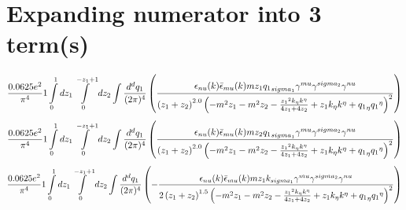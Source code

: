 \section*{Expanding numerator into 3 term(s)}
\begin{dmath}\frac{0.0625 e^{2}}{\pi^{4}}1\int\limits_{ 0 }^{ 1 } d{ z_{ 1 } }\int\limits_{ 0 }^{ - { z_{ 1 } } + 1 } d{ z_{ 2 } }\int\frac{d^d q_1 }{ (2\pi)^4 }\left(\frac{\epsilon_{ \\nu }({ k }) \bar{\epsilon}_{ \\mu }({ k }) m { z_{ 1 } } { { q_1 }_{ \\sigma_1 } } { \gamma^{ \\mu } } { \gamma^{ \\sigma_2 } } { \gamma^{ \\nu } }}{\left({ z_{ 1 } } + { z_{ 2 } }\right)^{2.0} \left(- m^{2} { z_{ 1 } } - m^{2} { z_{ 2 } } - \frac{{ z_{ 1 } }^{2} { { k }_{ \eta } } { { k }^{ \eta } }}{4 { z_{ 1 } } + 4 { z_{ 2 } }} + { z_{ 1 } } { { k }_{ \eta } } { { k }^{ \eta } } + { { q_1 }_{ \eta } } { { q_1 }^{ \eta } }\right)^{2}}\right)\end{dmath}
\begin{dmath}\frac{0.0625 e^{2}}{\pi^{4}}1\int\limits_{ 0 }^{ 1 } d{ z_{ 1 } }\int\limits_{ 0 }^{ - { z_{ 1 } } + 1 } d{ z_{ 2 } }\int\frac{d^d q_1 }{ (2\pi)^4 }\left(\frac{\epsilon_{ \\nu }({ k }) \bar{\epsilon}_{ \\mu }({ k }) m { z_{ 2 } } { { q_1 }_{ \\sigma_1 } } { \gamma^{ \\mu } } { \gamma^{ \\sigma_2 } } { \gamma^{ \\nu } }}{\left({ z_{ 1 } } + { z_{ 2 } }\right)^{2.0} \left(- m^{2} { z_{ 1 } } - m^{2} { z_{ 2 } } - \frac{{ z_{ 1 } }^{2} { { k }_{ \eta } } { { k }^{ \eta } }}{4 { z_{ 1 } } + 4 { z_{ 2 } }} + { z_{ 1 } } { { k }_{ \eta } } { { k }^{ \eta } } + { { q_1 }_{ \eta } } { { q_1 }^{ \eta } }\right)^{2}}\right)\end{dmath}
\begin{dmath}\frac{0.0625 e^{2}}{\pi^{4}}1\int\limits_{ 0 }^{ 1 } d{ z_{ 1 } }\int\limits_{ 0 }^{ - { z_{ 1 } } + 1 } d{ z_{ 2 } }\int\frac{d^d q_1 }{ (2\pi)^4 }\left(- \frac{\epsilon_{ \\nu }({ k }) \bar{\epsilon}_{ \\mu }({ k }) m { z_{ 1 } } { { k }_{ \\sigma_1 } } { \gamma^{ \\mu } } { \gamma^{ \\sigma_2 } } { \gamma^{ \\nu } }}{2 \left({ z_{ 1 } } + { z_{ 2 } }\right)^{1.5} \left(- m^{2} { z_{ 1 } } - m^{2} { z_{ 2 } } - \frac{{ z_{ 1 } }^{2} { { k }_{ \eta } } { { k }^{ \eta } }}{4 { z_{ 1 } } + 4 { z_{ 2 } }} + { z_{ 1 } } { { k }_{ \eta } } { { k }^{ \eta } } + { { q_1 }_{ \eta } } { { q_1 }^{ \eta } }\right)^{2}}\right)\end{dmath}
